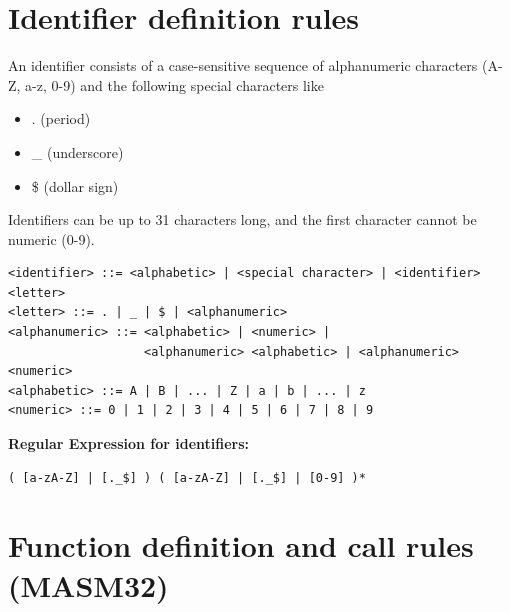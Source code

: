 \documentclass[11pt]{article}
\begin{document}
\section{Identifier definition rules}

An identifier consists of a case-sensitive sequence of alphanumeric characters (A-Z, a-z, 0-9) and the following special characters like
\begin{itemize}
	\item{ . (period)}
	\item{ \_ (underscore)}
	\item{ \$ (dollar sign)}
\end{itemize}
Identifiers can be up to 31 characters long, and the first character cannot be numeric (0-9).
\newline
{}
\newline
\lstset{language=, numbers=none}
\begin{lstlisting}
<identifier> ::= <alphabetic> | <special character> | <identifier> <letter>
<letter> ::= . | _ | $ | <alphanumeric>
<alphanumeric> ::= <alphabetic> | <numeric> | 
			       <alphanumeric> <alphabetic> | <alphanumeric> <numeric>
<alphabetic> ::= A | B | ... | Z | a | b | ... | z
<numeric> ::= 0 | 1 | 2 | 3 | 4 | 5 | 6 | 7 | 8 | 9
\end{lstlisting}
{\bf Regular Expression for identifiers:}
\newline
\begin{lstlisting}
( [a-zA-Z] | [._$] ) ( [a-zA-Z] | [._$] | [0-9] )*
\end{lstlisting}
\newpage

\section{Function definition and call rules (MASM32)}
\end{document}
